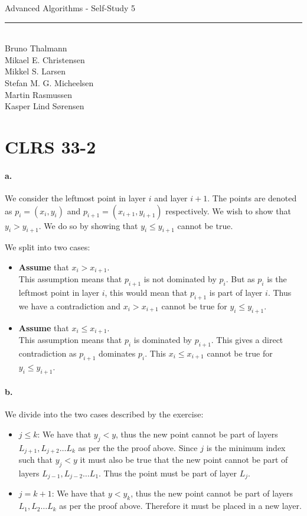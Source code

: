 
\usepackage{mathtools}
\DeclarePairedDelimiter{\ceil}{\lceil}{\rceil}
\DeclarePairedDelimiter\floor{\lfloor}{\rfloor}


\newcommand{\HRule}{\rule{\linewidth}{0.5mm}}


\begin{titlepage}
\centering
{\LARGE Advanced Algorithms - Self-Study 5}
\HRule \\[0.5cm]
Bruno Thalmann\\
			Mikael E. Christensen\\
			Mikkel S. Larsen\\
			Stefan M. G. Micheelsen\\
			Martin Rasmussen\\
			Kasper Lind Sørensen			
\end{titlepage}

\section*{CLRS 33-2}
\paragraph{a.}We consider the leftmost point in layer $i$ and layer $i+1$.
The points are denoted as $p_i = (x_i, y_i)$ and $p_{i +1} = (x_{i +1}, y_{i +1})$ respectively.
We wish to show that $y_i > y_{i +1}$.
We do so by showing that $y_i \leq y_{i +1}$ cannot be true.

We split into two cases:
\begin{itemize}
\item \textbf{Assume} that $x_i > x_{i+1}$.
\\This assumption means that $p_{i+1}$ is not dominated by $p_i$.
But as $p_i$ is the leftmost point in layer $i$, this would mean that $p_{i+1}$ is part of layer $i$.
Thus we have a contradiction and $x_i > x_{i+1}$ cannot be true for $y_i \leq y_{i+1}$.
\item \textbf{Assume} that $x_i \leq x_{i+1}$.
\\This assumption means that $p_i$ is dominated by $p_{i+1}$.
This gives a direct contradiction as $p_{i+1}$ dominates $p_i$.
This $x_i \leq x_{i+1}$ cannot be true for $y_i \leq y_{i+1}$.
\end{itemize}

\paragraph{b.}We divide into the two cases described by the exercise:
\begin{itemize}
\item $j \leq k$: We have that $y_j < y$, thus the new point cannot be part of layers $L_{j+1}, L_{j+2} \dots L_k$ as per the the proof above.
Since $j$ is the minimum index such that $y_j < y$ it must also be true that the new point cannot be part of layers $L_{j-1}, L_{j-2} \dots L_1$.
Thus the point must be part of layer $L_j$.
\item $j = k + 1$: We have that $y < y_k$, thus the new point cannot be part of layers $L_1, L_2 \dots L_k$ as per the proof above.
Therefore it must be placed in a new layer.
\end{itemize}

